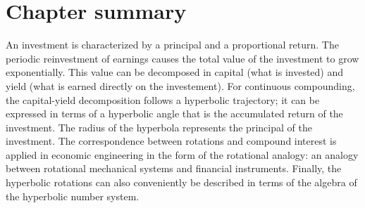\section*{Chapter summary}
An investment is characterized by a principal and a proportional return. The periodic reinvestment of earnings causes the total value of the investment to grow exponentially. This value can be decomposed in capital (what is invested) and yield (what is earned directly on the investement). For continuous compounding, the capital-yield decomposition follows a hyperbolic trajectory; it can be expressed in terms of a hyperbolic angle that is the accumulated return of the investment. The radius of the hyperbola represents the principal of the investment. The correspondence between rotations and compound interest is applied in economic engineering in the form of the rotational analogy: an analogy between rotational mechanical systems and financial instruments. Finally, the hyperbolic rotations can also conveniently be described in terms of the algebra of the hyperbolic number system.

